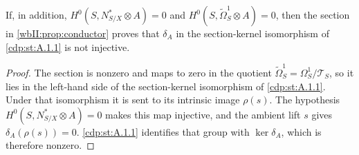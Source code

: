 \begin{corollary}
\hypertarget{tag-03DU}{}\label{wbII:cor:normal-crossing-kernel}

If, in addition, $H^0(S,N^*_{S/X}\otimes A)=0$ and
$H^0(S,\widetilde\Omega^1_S\otimes A)=0$, then the section in
\cref{wbII:prop:conductor} proves that $\delta_A$ in
the section-kernel isomorphism of \cref{cdp:st:A.1.1} is not injective.
\end{corollary}



\begin{proof}
The section is nonzero and maps to zero in the quotient
$\widetilde\Omega^1_S=\Omega^1_S/\mathscr T_S$, so it
lies in the left-hand side of the section-kernel isomorphism of \cref{cdp:st:A.1.1}.
Under that isomorphism it is sent to its intrinsic image $\rho(s)$.
The hypothesis $H^0(S,N^*_{S/X}\otimes A)=0$ makes this map injective,
and the ambient lift $s$ gives $\delta_A(\rho(s))=0$.  \cref{cdp:st:A.1.1}
identifies that group with $\ker\delta_A$, which is therefore nonzero.

\end{proof}